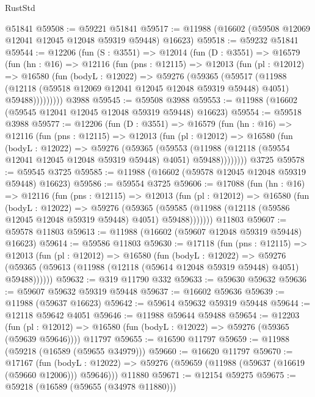 \begin{lexlean}{RustStd}
\begin{coremodule}
    @51841
@59508 := @59221 @51841
@59517 := @11988 (@16602 (@59508 @12069 @12041 @12045 @12048 @59319 @59448) @16623)
@59518 := @59232 @51841
@59544 := @12206
    (fun (S : @3551) =>
    @12014
      (fun (D : @3551) =>
      @16579
        (fun (hn : @16) =>
        @12116
          (fun (pns : @12115) =>
          @12013
            (fun (pl : @12012) =>
            @16580
              (fun (bodyL : @12022) =>
              @59276
                (@59365
                  (@59517
                    (@11988
                      (@12118 (@59518 @12069 @12041 @12045 @12048 @59319 @59448) @4051)
                      @59488)))))))))
    @3988
@59545 := @59508 @3988
@59553 := @11988 (@16602 (@59545 @12041 @12045 @12048 @59319 @59448) @16623)
@59554 := @59518 @3988
@59577 := @12206
    (fun (D : @3551) =>
    @16579
      (fun (hn : @16) =>
      @12116
        (fun (pns : @12115) =>
        @12013
          (fun (pl : @12012) =>
          @16580
            (fun (bodyL : @12022) =>
            @59276
              (@59365
                (@59553
                  (@11988 (@12118 (@59554 @12041 @12045 @12048 @59319 @59448) @4051) @59488))))))))
    @3725
@59578 := @59545 @3725
@59585 := @11988 (@16602 (@59578 @12045 @12048 @59319 @59448) @16623)
@59586 := @59554 @3725
@59606 := @17088
    (fun (hn : @16) =>
    @12116
      (fun (pns : @12115) =>
      @12013
        (fun (pl : @12012) =>
        @16580
          (fun (bodyL : @12022) =>
          @59276
            (@59365
              (@59585 (@11988 (@12118 (@59586 @12045 @12048 @59319 @59448) @4051) @59488)))))))
    @11803
@59607 := @59578 @11803
@59613 := @11988 (@16602 (@59607 @12048 @59319 @59448) @16623)
@59614 := @59586 @11803
@59630 := @17118
    (fun (pns : @12115) =>
    @12013
      (fun (pl : @12012) =>
      @16580
        (fun (bodyL : @12022) =>
        @59276 (@59365 (@59613 (@11988 (@12118 (@59614 @12048 @59319 @59448) @4051) @59488))))))
@59632 := @319 @11790 @332
@59633 := @59630 @59632
@59636 := @59607 @59632 @59319 @59448
@59637 := @16602 @59636
@59639 := @11988 (@59637 @16623)
@59642 := @59614 @59632 @59319 @59448
@59644 := @12118 @59642 @4051
@59646 := @11988 @59644 @59488
@59654 := @12203
    (fun (pl : @12012) => @16580 (fun (bodyL : @12022) => @59276 (@59365 (@59639 @59646))))
    @11797
@59655 := @16590 @11797
@59659 := @11988 (@59218 (@16589 (@59655 @34979)))
@59660 := @16620 @11797
@59670 := @17167
    (fun (bodyL : @12022) => @59276 (@59659 (@11988 (@59637 (@16619 (@59660 @12006))) @59646)))
    @11880
@59671 := @12154 @59275
@59675 := @59218 (@16589 (@59655 (@34978 @11880)))

\end{coremodule}
\end{lexlean}
